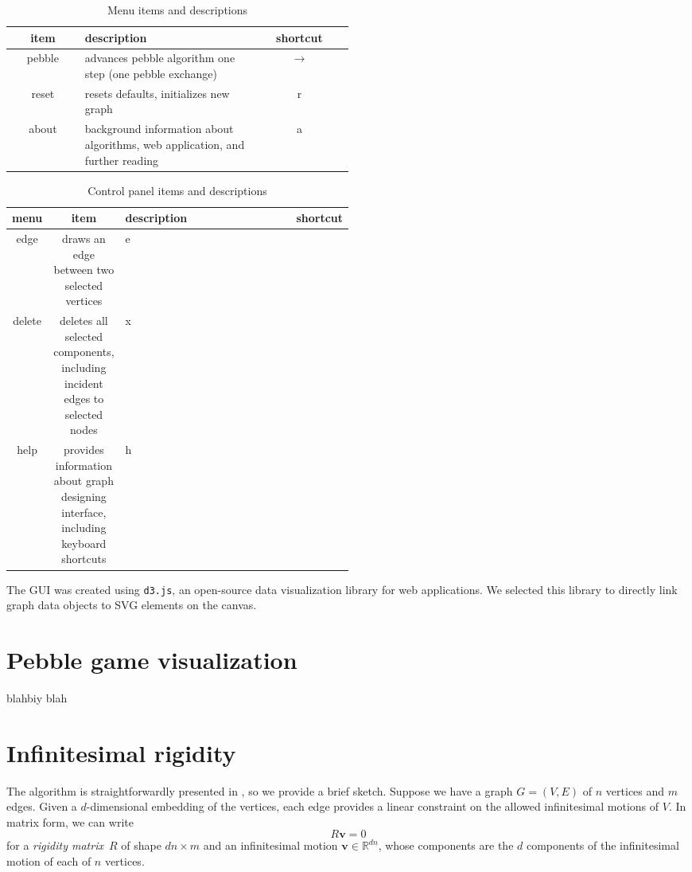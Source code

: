 \documentclass[aps,final,twocolumn,letterpaper,nofootinbib]{revtex4-1}
\newcommand\RR{\mathbb{R}}
\newcommand{\mb}{\mathbf}
\begin{document}
\begin{table}[ht]
\caption{Menu items and descriptions}
\begin{tabular}{c | p{0.5\linewidth} | c}
item & description & shortcut \\ \hline
pebble & advances pebble algorithm one step
(one pebble exchange) & $\to$\\
reset & resets defaults, initializes new graph & r \\
about & background information about algorithms,
web application, and further reading & a \\
\end{tabular}
\label{tab:menu}
\end{table}

\begin{table}[ht]
\caption{Control panel items and descriptions}
\begin{tabular}{c c | p{0.5\linewidth} | c}
\multirow{3}{*}{menu} &
item & description & shortcut \\ \hline
edge & draws an edge between two selected vertices & e\\
delete & deletes all selected components, including incident edges
to selected nodes & x \\
help & provides information about graph designing interface,
including keyboard shortcuts & h \\
\end{tabular}
\label{tab:ctrl}
\end{table}

The GUI was created using \texttt{d3.js},
an open-source data visualization library for web applications.
We selected this library
to directly link graph data objects to SVG elements on the canvas.

\section{Pebble game visualization}
\label{sec:pebble}

blahbiy blah
\section{Infinitesimal rigidity}
\label{sec:infrigid}

The algorithm is straightforwardly presented in \cite[\S4.4.2]{gfalop},
so we provide a brief sketch.
Suppose we have a graph $G = (V, E)$ of $n$ vertices and $m$ edges.
Given a $d$-dimensional embedding of the vertices,
each edge provides a linear constraint
on the allowed infinitesimal motions of $V$.
In matrix form, we can write
\begin{equation}
    R\mb v = 0
\end{equation}
for a \emph{rigidity matrix}~$R$ of shape $dn \times m$
and an infinitesimal motion $\mb v \in \RR^{dn}$,
whose components are the $d$ components
of the infinitesimal motion of each of $n$ vertices.
\end{document}
